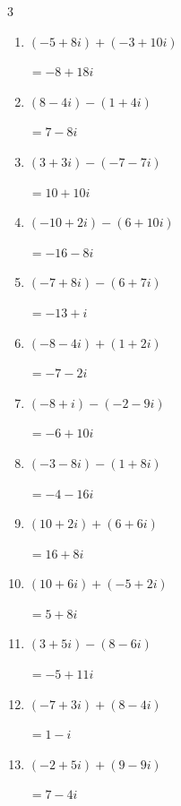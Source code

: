 \begin{multicols}{3}
\begin{enumerate}
        $\displaystyle =12-16i$

  \item $\displaystyle (-5+8i) + (-3+10i)$

        $\displaystyle =-8+18i$

  \item $\displaystyle (8-4i) - (1+4i)$

        $\displaystyle =7-8i$

  \item $\displaystyle (3+3i) - (-7-7i)$

        $\displaystyle =10+10i$

  \item $\displaystyle (-10+2i) - (6+10i)$

        $\displaystyle =-16-8i$

\columnbreak %

  \item $\displaystyle (-7+8i) - (6+7i)$

        $\displaystyle =-13+i$

  \item $\displaystyle (-8-4i) + (1+2i)$

        $\displaystyle =-7-2i$

  \item $\displaystyle (-8+i) - (-2-9i)$

        $\displaystyle =-6+10i$

  \item $\displaystyle (-3-8i) - (1+8i)$

        $\displaystyle =-4-16i$

  \item $\displaystyle (10+2i) + (6+6i)$

        $\displaystyle =16+8i$

  \item $\displaystyle (10+6i) + (-5+2i)$

        $\displaystyle =5+8i$

  \item $\displaystyle (3+5i) - (8-6i)$

        $\displaystyle =-5+11i$

  \item $\displaystyle (-7+3i) + (8-4i)$

        $\displaystyle =1-i$

  \item $\displaystyle (-2+5i) + (9-9i)$

        $\displaystyle =7-4i$


\end{enumerate}
\end{multicols}
